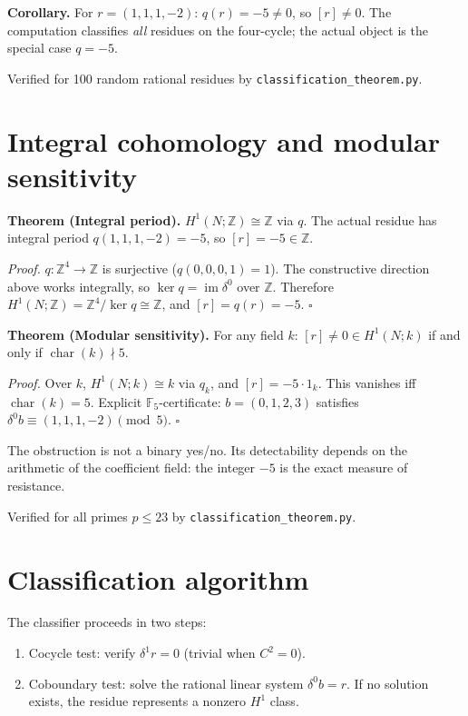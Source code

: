 \documentclass[11pt]{article}
\begin{document}
\textbf{Corollary.}
For $r=(1,1,1,-2)$: $q(r)=-5\neq 0$, so $[r]\neq 0$. The computation
classifies \emph{all} residues on the four-cycle; the actual object is the
special case $q=-5$.

Verified for 100 random rational residues by \texttt{classification\_theorem.py}.

\section{Integral cohomology and modular sensitivity}\label{thm:modular}

\textbf{Theorem (Integral period).}
$H^1(N;\mathbb{Z})\cong\mathbb{Z}$ via $q$. The actual residue has integral
period $q(1,1,1,-2)=-5$, so $[r]=-5\in\mathbb{Z}$.

\textit{Proof.}
$q:\mathbb{Z}^4\to\mathbb{Z}$ is surjective ($q(0,0,0,1)=1$). The constructive
direction above works integrally, so $\ker q=\operatorname{im}\delta^0$ over
$\mathbb{Z}$. Therefore $H^1(N;\mathbb{Z})=\mathbb{Z}^4/\ker q\cong\mathbb{Z}$,
and $[r]=q(r)=-5$. $\square$

\textbf{Theorem (Modular sensitivity).}
For any field $k$: $[r]\neq 0\in H^1(N;k)$ if and only if
$\operatorname{char}(k)\nmid 5$.

\textit{Proof.}
Over $k$, $H^1(N;k)\cong k$ via $q_k$, and $[r]=-5\cdot 1_k$. This vanishes
iff $\operatorname{char}(k)=5$.
Explicit $\mathbb{F}_5$-certificate: $b=(0,1,2,3)$ satisfies
$\delta^0 b\equiv(1,1,1,-2)\pmod{5}$. $\square$

The obstruction is not a binary yes/no. Its detectability depends on the
arithmetic of the coefficient field: the integer $-5$ is the exact measure of
resistance.

Verified for all primes $p\le 23$ by \texttt{classification\_theorem.py}.

\section{Classification algorithm}
The classifier proceeds in two steps:
\begin{enumerate}
  \item Cocycle test: verify $\delta^1 r = 0$ (trivial when $C^2=0$).
  \item Coboundary test: solve the rational linear system $\delta^0 b = r$.
    If no solution exists, the residue represents a nonzero $H^1$ class.
\end{enumerate}
\end{document}
